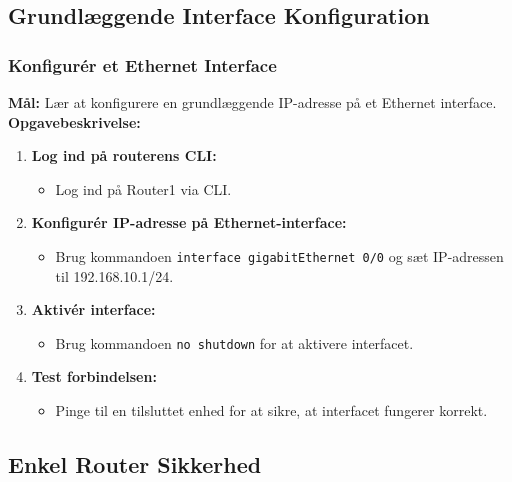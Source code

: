 \subsection{Grundlæggende Interface Konfiguration}
\subsubsection*{Konfigurér et Ethernet Interface}
\textbf{Mål:} Lær at konfigurere en grundlæggende IP-adresse på et Ethernet interface.
\newline\newline\noindent
\textbf{Opgavebeskrivelse:}
\begin{enumerate}
	\item \textbf{Log ind på routerens CLI:}
	\begin{itemize}
		\item Log ind på Router1 via CLI.
	\end{itemize}
	\item \textbf{Konfigurér IP-adresse på Ethernet-interface:}
	\begin{itemize}
		\item Brug kommandoen \texttt{interface gigabitEthernet 0/0} og sæt IP-adressen til 192.168.10.1/24.
	\end{itemize}
	\item \textbf{Aktivér interface:}
	\begin{itemize}
		\item Brug kommandoen \texttt{no shutdown} for at aktivere interfacet.
	\end{itemize}
	\item \textbf{Test forbindelsen:}
	\begin{itemize}
		\item Pinge til en tilsluttet enhed for at sikre, at interfacet fungerer korrekt.
	\end{itemize}
\end{enumerate}

\subsection{Enkel Router Sikkerhed}
